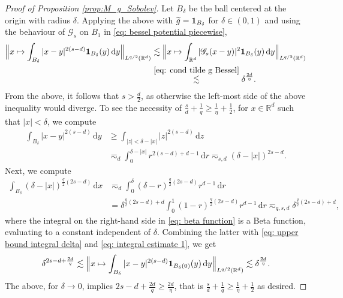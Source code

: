 \documentclass[reqno]{amsart}
\theoremstyle{plain}
\theoremstyle{remark}
\theoremstyle{plain}
\numberwithin{equation}{section}
\newcommand\cG{\mathscr{G}}
\def\R{{\mathbb R}}
\newcommand{\wt}{\widetilde}
\newcommand{\di}{\mathrm{d}}
\newcommand{\one}{{{\bf 1}}}
\newcommand{\1}{\one}
\begin{document}
\begin{proof}[Proof of Proposition \ref{prop:M_g_Sobolev}]
Let $B_\delta$ be the ball centered at the origin with radius $\delta$. Applying the above with $\wt{ g} = \one_{B_{\delta}}$ for $\delta \in (0,1)$ and using the behaviour of $\cG_s$ on $B_1$ in \eqref{eq: bessel potential piecewise}, 
 \begin{align}
 \nonumber
 \Big\| x\mapsto \int_{B_\delta} |x-y|^{2(s-d)}\one_{B_\delta}(y)\,\di y \Big\|_{L^{q/2}(\R^d)}
       &\lesssim
     \Big\| x\mapsto \int_{\R^d} |\cG_s(x-y)|^2\one_{B_\delta}(y)\,\di y \Big\|_{L^{q/2}(\R^d)}\\ &\stackrel{\eqref{eq: cond tilde g Bessel}}{\lesssim} \delta^{\frac{2d}{\eta}}.
      \label{eq: upper bound integral delta}
 \end{align}
 From the above, it follows that $s>\tfrac{d}{2}$, as otherwise the left-most side of the above inequality would diverge. To see the necessity of $\tfrac{s}{d}+\tfrac{1}{q}\geq \tfrac{1}{\eta}+\tfrac{1}{2}$, for $x\in \R^d$ such that $|x|<\delta$, we compute
\begin{align}\label{eq: integral estimate 1}
    \int_{B_\delta} |x-y|^{2(s-d)}\,\di y & \geq \int_{|z|<\delta -|x|} |z|^{2(s-d)}\,\di z \\ & \eqsim_d \int_0^{\delta-|x|} r^{2(s-d)+d-1}\,\di r
    \eqsim_{s,d} (\delta - |x|)^{2s-d}.
\end{align}
Next, we compute 
\begin{align}
    \int_{B_\delta}(\delta-|x|)^{\frac{q}{2}(2s-d)}\,\di x 
    &\eqsim_d \int_0^\delta (\delta - r)^{\frac{q}{2}(2s-d)}r^{d-1}\,\di  r\\
    \label{eq: beta function}
    & = \delta^{\frac{q}{2}(2s-d)+d}  \int_0^1 (1-r)^{\frac{q}{2}(2s-d)}r^{d-1}\, \di r \eqsim_{q,s,d} \delta^{\frac{q}{2}(2s-d)+d},
\end{align}
where the integral on the right-hand side in \eqref{eq: beta function} is a Beta function, evaluating to a constant independent of $\delta$.
Combining the latter with \eqref{eq: upper bound integral delta} and \eqref{eq: integral estimate 1}, we get
\begin{align}
    \delta^{2s-d+\frac{2d}{q}}\lesssim  
    \Big\|x\mapsto \int_{B_\delta} |x-y|^{2(s-d)}\one_{B_\delta(0)}(y)\,\di y \Big\|_{L^{q/2}(\R^d)}\lesssim \delta^{\frac{2d}{\eta}}.
\end{align}
The above, for $\delta\to 0$, implies $2s-d+\frac{2d}{q}\geq \tfrac{2d}{\eta}$, that is $\tfrac{s}{d}+\tfrac{1}{q}\geq \tfrac{1}{\eta}+\tfrac{1}{2}$ as desired.

\smallskip


\end{proof}
\end{document}
